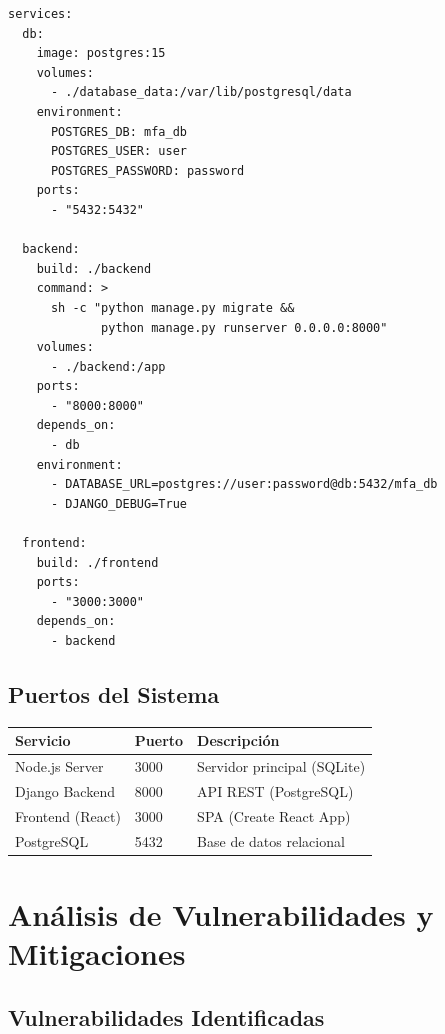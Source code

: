 \documentclass[12pt,a4paper,openany]{article}
\begin{document}
\begin{lstlisting}[style=pythonstyle, caption={Configuración Docker Compose}]
services:
  db:
    image: postgres:15
    volumes:
      - ./database_data:/var/lib/postgresql/data
    environment:
      POSTGRES_DB: mfa_db
      POSTGRES_USER: user
      POSTGRES_PASSWORD: password
    ports:
      - "5432:5432"

  backend:
    build: ./backend
    command: >
      sh -c "python manage.py migrate &&
             python manage.py runserver 0.0.0.0:8000"
    volumes:
      - ./backend:/app
    ports:
      - "8000:8000"
    depends_on:
      - db
    environment:
      - DATABASE_URL=postgres://user:password@db:5432/mfa_db
      - DJANGO_DEBUG=True

  frontend:
    build: ./frontend
    ports:
      - "3000:3000"
    depends_on:
      - backend
\end{lstlisting}

\subsection{Puertos del Sistema}

\begin{table}[H]
\centering
\begin{tabular}{@{}lll@{}}
\toprule
\textbf{Servicio} & \textbf{Puerto} & \textbf{Descripción} \\
\midrule
Node.js Server & 3000 & Servidor principal (SQLite) \\
Django Backend & 8000 & API REST (PostgreSQL) \\
Frontend (React) & 3000 & SPA (Create React App) \\
PostgreSQL & 5432 & Base de datos relacional \\
\bottomrule
\end{tabular}
\end{table}

\section{Análisis de Vulnerabilidades y Mitigaciones}

\subsection{Vulnerabilidades Identificadas}
\end{document}

